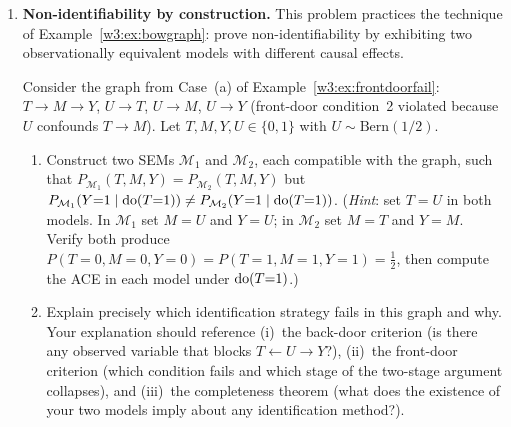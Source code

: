\documentclass[master.tex]{subfiles}
\begin{document}
\begin{enumerate}[label=\textbf{\arabic*.}, leftmargin=*, itemsep=10pt]
  \item \textbf{Non-identifiability by construction.}
  This problem practices the technique of
  Example~\ref{w3:ex:bowgraph}: prove non-identifiability by
  exhibiting two observationally equivalent models with different
  causal effects.

  Consider the graph from Case~(a) of
  Example~\ref{w3:ex:frontdoorfail}: $T \to M \to Y$,
  $U \to T$, $U \to M$, $U \to Y$ (front-door condition~2 violated
  because $U$ confounds $T \to M$).  Let $T, M, Y, U \in \{0,1\}$
  with $U \sim \mathrm{Bern}(1/2)$.

  \begin{enumerate}[label=(\alph*)]
    \item Construct two SEMs $\mathcal{M}_1$ and $\mathcal{M}_2$,
          each compatible with the graph, such that
          $P_{\mathcal{M}_1}(T, M, Y) = P_{\mathcal{M}_2}(T, M, Y)$
          but
          $P_{\mathcal{M}_1}(Y{=}1 \mid \mathrm{do}(T{=}1))
          \ne P_{\mathcal{M}_2}(Y{=}1 \mid \mathrm{do}(T{=}1))$.
          (\textit{Hint}: set $T = U$ in both models.  In
          $\mathcal{M}_1$ set $M = U$ and $Y = U$; in $\mathcal{M}_2$
          set $M = T$ and $Y = M$.  Verify both produce
          $P(T{=}0, M{=}0, Y{=}0) = P(T{=}1, M{=}1, Y{=}1) =
          \tfrac{1}{2}$, then compute the ACE in each model under
          $\mathrm{do}(T{=}1)$.)

    \item Explain precisely which identification strategy fails in
          this graph and why.  Your explanation should reference
          (i)~the back-door criterion (is there any observed variable
          that blocks $T \leftarrow U \to Y$?), (ii)~the front-door
          criterion (which condition fails and which stage of the
          two-stage argument collapses), and (iii)~the completeness
          theorem (what does the existence of your two models imply
          about any identification method?).
  \end{enumerate}

\end{enumerate}

\newpage
\ifSubfilesClassLoaded{
  
  
}{}
\end{document}
